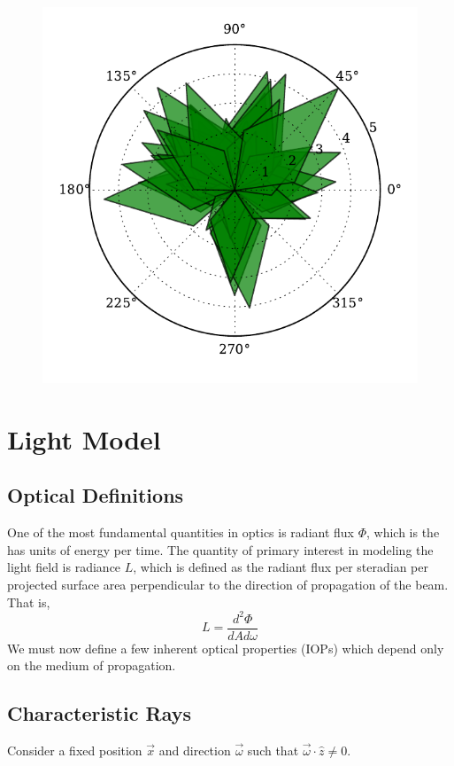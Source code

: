 \begin{figure}[h]
	\centering
	\includegraphics[width=.75\linewidth]{kelp_sample}
	\vspace{-2em}
	\label{fig:kelp_sample}
\end{figure}


\section{Light Model}

\subsection{Optical Definitions}
One of the most fundamental quantities in optics is radiant flux $\Phi$, which is the has units of energy per time.
The quantity of primary interest in modeling the light field is radiance $L$, which is defined as the radiant flux per steradian per projected surface area perpendicular to the direction of propagation of the beam.
That is,
\begin{equation}
	L = \frac{d^2\Phi}{dA d\omega}
\end{equation}
We must now define a few inherent optical properties (IOPs) which depend only on the medium of propagation.

\subsection{Characteristic Rays}
Consider a fixed position $\vec{x}$ and direction $\vec{\omega}$ such that
$\vec{\omega} \cdot \hat{z} \neq 0$.

